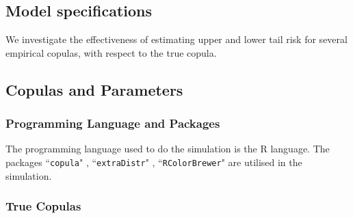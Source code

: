 \documentclass[12pt]{report}
\newcommand{\1}{\mathbf{1}}
\begin{document}
\begin{flushleft}
\newpage
\section{Model specifications}
\vspace{0.5cm}
We investigate the effectiveness of estimating upper and lower tail risk for several empirical copulas, with respect to the true copula. \\
\vspace{0.5cm}
\subsection{Copulas and Parameters}
\vspace{0.5cm}
\subsubsection{Programming Language and Packages}

The programming language used to do the simulation is the \textsf{R} language. The packages ``\texttt{copula}" \parencite{copulaRPackage2023}, ``\texttt{extraDistr}" \parencite{extraDistrRPackage2023}, ``\texttt{RColorBrewer}" \parencite{RColorBrewerRPackage2022} are utilised in the simulation.

\subsubsection{True Copulas}


\end{flushleft}
\end{document}
